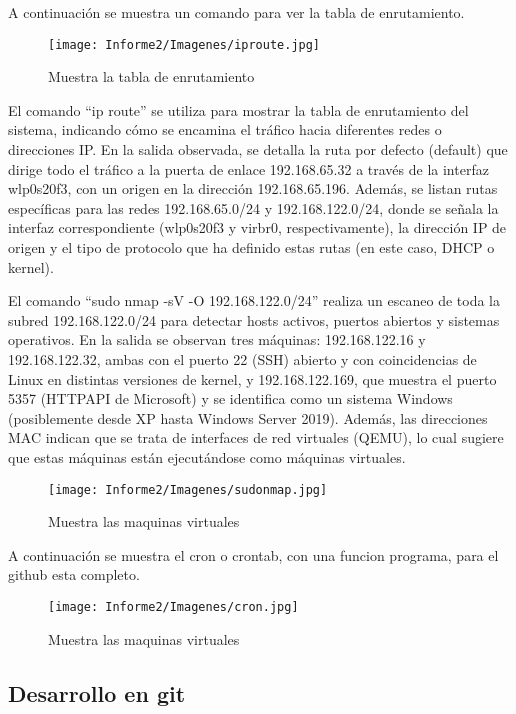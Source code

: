 \documentclass[conference]{IEEEtran}
\begin{document}
A continuación se muestra un comando para ver la tabla de enrutamiento.


\begin{figure}[h!]
\centering
\texttt{[image: Informe2/Imagenes/iproute.jpg]}
\caption{Muestra la tabla de enrutamiento}
\end{figure}

El comando “ip route” se utiliza para mostrar la tabla de enrutamiento del sistema, indicando cómo se encamina el tráfico hacia diferentes redes o direcciones IP. En la salida observada, se detalla la ruta por defecto (default) que dirige todo el tráfico a la puerta de enlace 192.168.65.32 a través de la interfaz wlp0s20f3, con un origen en la dirección 192.168.65.196. Además, se listan rutas específicas para las redes 192.168.65.0/24 y 192.168.122.0/24, donde se señala la interfaz correspondiente (wlp0s20f3 y virbr0, respectivamente), la dirección IP de origen y el tipo de protocolo que ha definido estas rutas (en este caso, DHCP o kernel).

El comando “sudo nmap -sV -O 192.168.122.0/24” realiza un escaneo de toda la subred 192.168.122.0/24 para detectar hosts activos, puertos abiertos y sistemas operativos. En la salida se observan tres máquinas: 192.168.122.16 y 192.168.122.32, ambas con el puerto 22 (SSH) abierto y con coincidencias de Linux en distintas versiones de kernel, y 192.168.122.169, que muestra el puerto 5357 (HTTPAPI de Microsoft) y se identifica como un sistema Windows (posiblemente desde XP hasta Windows Server 2019). Además, las direcciones MAC indican que se trata de interfaces de red virtuales (QEMU), lo cual sugiere que estas máquinas están ejecutándose como máquinas virtuales.

\begin{figure}[h!]
\centering
\texttt{[image: Informe2/Imagenes/sudonmap.jpg]}
\caption{Muestra las maquinas virtuales}
\end{figure}

A continuación se muestra el cron o crontab, con una funcion programa, para el github esta completo.

\begin{figure}[h!]
\centering
\texttt{[image: Informe2/Imagenes/cron.jpg]}
\caption{Muestra las maquinas virtuales}
\end{figure}


\subsection{Desarrollo en git}
\end{document}
